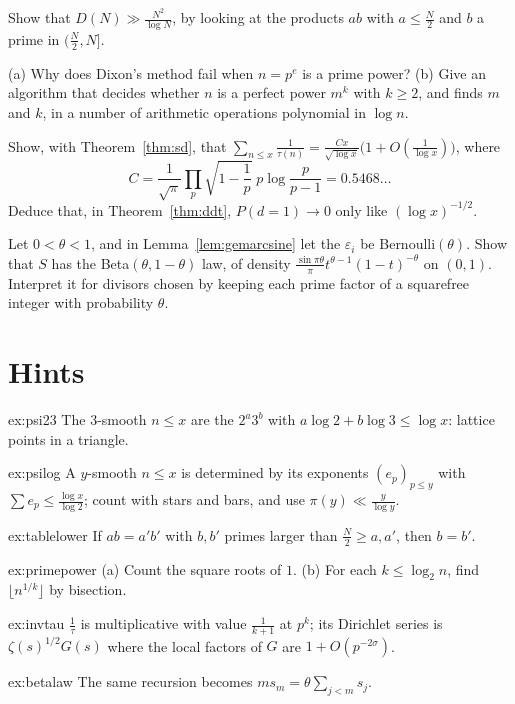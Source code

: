 \begin{exercise}[$\star$]\label{ex:tablelower}
Show that $D(N)\gg\frac{N^2}{\log N}$, by looking at the products $ab$ with $a\le\frac N2$ and $b$ a prime in $(\frac N2,N]$.
\end{exercise}

\begin{exercise}[$\star\star$]\label{ex:primepower}
(a) Why does Dixon's method fail when $n=p^e$ is a prime power? (b) Give an algorithm that decides whether $n$ is a perfect power $m^k$ with $k\ge2$, and finds $m$ and $k$, in a number of arithmetic operations polynomial in $\log n$.
\end{exercise}

\begin{exercise}[$\star\star$]\label{ex:invtau}
Show, with Theorem~\ref{thm:sd}, that $\sum_{n\le x}\frac1{\tau(n)}=\frac{Cx}{\sqrt{\log x}}\bigl(1+O(\frac1{\log x})\bigr)$, where
\[
C=\frac1{\sqrt\pi}\prod_p\sqrt{1-\frac1p}\;p\log\frac p{p-1}=0.5468\ldots
\]
Deduce that, in Theorem~\ref{thm:ddt}, $P(d=1)\to0$ only like $(\log x)^{-1/2}$.
\end{exercise}

\begin{exercise}[$\star\star\star$]\label{ex:betalaw}
Let $0<\theta<1$, and in Lemma~\ref{lem:gemarcsine} let the $\varepsilon_i$ be Bernoulli$(\theta)$. Show that $S$ has the Beta$(\theta,1-\theta)$ law, of density $\frac{\sin\pi\theta}\pi t^{\theta-1}(1-t)^{-\theta}$ on $(0,1)$. Interpret it for divisors chosen by keeping each prime factor of a squarefree integer with probability $\theta$.
\end{exercise}

\section{Hints}

\begin{hint}{ex:psi23}
The $3$-smooth $n\le x$ are the $2^a3^b$ with $a\log2+b\log3\le\log x$: lattice points in a triangle.
\end{hint}
\begin{hint}{ex:psilog}
A $y$-smooth $n\le x$ is determined by its exponents $(e_p)_{p\le y}$ with $\sum e_p\le\frac{\log x}{\log2}$; count with stars and bars, and use $\pi(y)\ll\frac y{\log y}$.
\end{hint}
\begin{hint}{ex:tablelower}
If $ab=a'b'$ with $b,b'$ primes larger than $\frac N2\ge a,a'$, then $b=b'$.
\end{hint}
\begin{hint}{ex:primepower}
(a) Count the square roots of $1$. (b) For each $k\le\log_2n$, find $\lfloor n^{1/k}\rfloor$ by bisection.
\end{hint}
\begin{hint}{ex:invtau}
$\frac1\tau$ is multiplicative with value $\frac1{k+1}$ at $p^k$; its Dirichlet series is $\zeta(s)^{1/2}G(s)$ where the local factors of $G$ are $1+O(p^{-2\sigma})$.
\end{hint}
\begin{hint}{ex:betalaw}
The same recursion becomes $ms_m=\theta\sum_{j<m}s_j$.
\end{hint}

